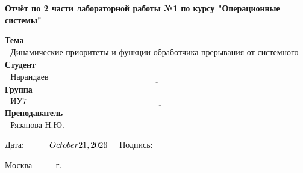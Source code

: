 \begin{titlepage}
	
	\begin{center}
		\Large\textbf{Отчёт по 2 части лабораторной работы №1}
		\Large\textbf {по курсу "Операционные системы"}
	\end{center}
	
	\noindent\textbf{\newline Тема} $\underline{\text{~~Динамические приоритеты и функции обработчика прерывания от системного таймера}}$\newline\newline
	\noindent\textbf{Студент} $\underline{\text{~~Нарандаев Д.С.~~~~~~~~~~~~~~~~~~~~~~~~~~~~~~~~~~~~~~~~~~~~~~~~~~~~~~~~~~~~~~~~~~~~~~~~~~~~~~~~~~~~~~~~~~~~~~}}$\newline\newline
	\noindent\textbf{Группа} $\underline{\text{~~ИУ7-52Б~~~~~~~~~~~~~~~~~~~~~~~~~~~~~~~~~~~~~~~~~~~~~~~~~~~~~~~~~~~~~~~~~~~~~~~~~~~~~~~~~~~~~~~~~~~~~~~~~~~~~~~~~~}}$\newline\newline
	\noindent\textbf{Преподаватель} $\underline{\text{~~Рязанова Н.Ю.~~~~~~~~~~~~~~~~~~~~~~~~~~~~~~~~~~~~~~~~~~~~~~~~~~~~~~~~~~~~~~~~~~~~~~~~~~~~~~~~~~~}}$\newline
	
	\begin{text}
		\newline\newline\newline
		\null\hfill Дата:$~~~~~~$\newline
		\null\hfill \underline{$~~~~\today~~~$}\newline
		\newline
		\null\hfill Подпись:$~~~~$\newline
		\null\hfill \underline{$~~~~~~~~~~~~~~~~~~~~~$}\newline
	\end{text}
	
	\begin{center}
		\vfill
		Москва~---~\the\year
		~г.
	\end{center}
	\restoregeometry
\end{titlepage}
